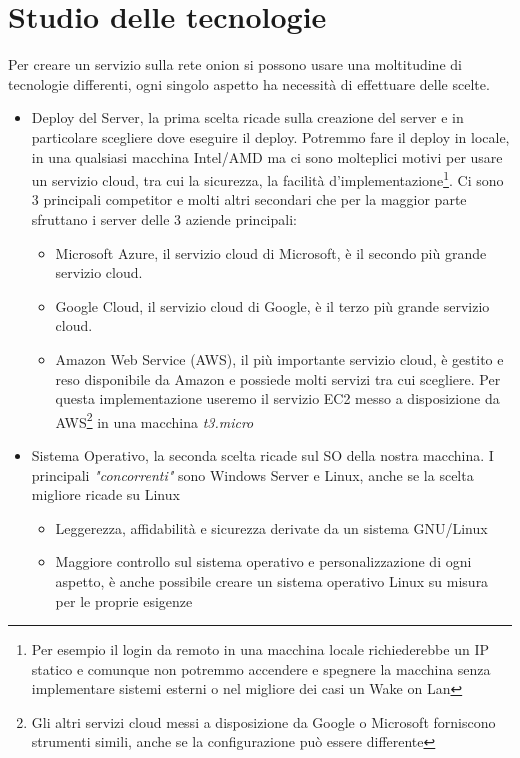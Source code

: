 \newpage
\section{Studio delle tecnologie}
Per creare un servizio sulla rete onion si possono usare una moltitudine di tecnologie differenti, ogni singolo aspetto ha necessità di effettuare delle scelte. \\
\begin{itemize}
    \item Deploy del Server, la prima scelta ricade sulla creazione del server e in particolare scegliere dove eseguire il deploy. Potremmo fare il deploy in locale, in una qualsiasi macchina Intel/AMD ma ci sono molteplici motivi per usare un servizio cloud, tra cui la sicurezza, la facilità d'implementazione\footnote{Per esempio il login da remoto in una macchina locale richiederebbe un IP statico e comunque non potremmo accendere e spegnere la macchina senza implementare sistemi esterni o nel migliore dei casi un Wake on Lan}. Ci sono 3 principali competitor e molti altri secondari che per la maggior parte sfruttano i server delle 3 aziende principali: 
    \begin{itemize}
        \item Microsoft Azure, il servizio cloud di Microsoft, è il secondo più grande servizio cloud.
        \item Google Cloud, il servizio cloud di Google, è il terzo più grande servizio cloud.
        \item Amazon Web Service (AWS), il più importante servizio cloud, è gestito e reso disponibile da Amazon e possiede molti servizi tra cui scegliere. Per questa implementazione useremo il servizio EC2 messo a disposizione da AWS\footnote{Gli altri servizi cloud messi a disposizione da Google o Microsoft forniscono strumenti simili, anche se la configurazione può essere differente} in una macchina \emph{t3.micro}
    \end{itemize}
    \item Sistema Operativo, la seconda scelta ricade sul SO della nostra macchina. I principali \emph{"concorrenti"} sono Windows Server e Linux, anche se la scelta migliore ricade su Linux
    \begin{itemize}
        \item Leggerezza, affidabilità e sicurezza derivate da un sistema GNU/Linux
        \item Maggiore controllo sul sistema operativo e personalizzazione di ogni aspetto, è anche possibile creare un sistema operativo Linux su misura per le proprie esigenze

\end{itemize}
\end{itemize}
